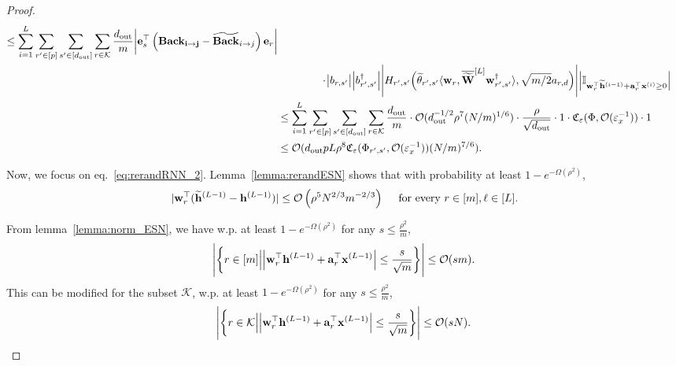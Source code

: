\begin{proof}
\begin{align}
				\le \sum_{i=1}^{L} \sum_{r' \in [p]} \sum_{s' \in [d_{\mathrm{out}} ]} \sum_{r \in \mathcal{K}} \frac{d_{\mathrm{out}} }{m} \abs{\mathbf{e}_s^{\top} \left(\mathbf{Back_{i \to j}} - \widetilde{\mathbf{Back}}_{i \to j} \right) \mathbf{e}_r}  \nonumber\\& \quad \quad \quad \quad \cdot \abs{b_{r, s'}} \abs{b_{r', s'}^{\dagger}} \abs{  H_{r', s'}\Big(\widetilde{\theta}_{r', s'} \langle \mathbf{w}_{r}, \overline{\widetilde{\mathbf{W}}}^{[L]} \mathbf{w}_{r', s'}^{\dagger}\rangle , \sqrt{m/2} a_{r, d}\Big)} \abs{\mathbb{I}_{\mathbf{w}_r^{\top} \widetilde{\mathbf{h}}^{(i-1)} + \mathbf{a}_r^{\top} \mathbf{x}^{(i)} \ge 0}} \nonumber\\&
				\le \sum_{i=1}^{L} \sum_{r' \in [p]} \sum_{s' \in [d_{\mathrm{out}} ]} \sum_{r \in \mathcal{K}} \frac{d_{\mathrm{out}} }{m} \cdot \mathcal{O}(d_{\mathrm{out}} ^{-1/2} \rho^7 (N/m)^{1/6}) \cdot \frac{\rho}{\sqrt{d_{\mathrm{out}} }} \cdot 1 \cdot \mathfrak{C}_{\varepsilon}(\Phi, \mathcal{O}(\varepsilon_x^{-1})) \cdot 1 \\&
				\le \mathcal{O}( d_{\mathrm{out}}  pL \rho^8 \mathfrak{C}_{\varepsilon}(\Phi_{r', s'}, \mathcal{O}(\varepsilon_x^{-1})) (N/m)^{7/6}) \label{eq:rerandRNN_1SOLVE}.
			\end{align}
			\endgroup
			
			
			Now, we focus on eq.~\ref{eq:rerandRNN_2}. Lemma~\ref{lemma:rerandESN} shows that with probability at least $1 - e^{-\Omega(\rho^2)}$,
			\begin{equation*}
				\abs[0]{\mathbf{w}_r^{\top} (\widetilde{\mathbf{h}}^{(L-1)} -  \mathbf{h}^{(L-1)})} \leq \mathcal{O}\left(\rho^{5} N^{2 / 3} m^{-2 / 3}\right) \quad \text { for every } r \in [m], \ell \in[L].
			\end{equation*}
			
			From lemma~\ref{lemma:norm_ESN}, we have w.p. at least $1 - e^{-\Omega(\rho^2)}$ for any $s \le \frac{\rho^2}{m}$,
			\begin{align*}
				\abs{\left\{r \in [m] \Big| \abs{\mathbf{w}_r^{\top} \mathbf{h}^{(L-1)} + \mathbf{a}_r^{\top} \mathbf{x}^{(L-1)}} \le \frac{s}{\sqrt{m}} \right\}} \le \mathcal{O}(sm).
			\end{align*}
			This can be modified for the subset $\mathcal{K}$,  w.p. at least $1 - e^{-\Omega(\rho^2)}$ for any $s \le \frac{\rho^2}{m}$,
			\begin{align*}
				\abs{\left\{r \in \mathcal{K} \Big| \abs{\mathbf{w}_r^{\top} \mathbf{h}^{(L-1)} + \mathbf{a}_r^{\top} \mathbf{x}^{(L-1)}} \le  \frac{s}{\sqrt{m}} \right\}} \le \mathcal{O}(sN).
			\end{align*}
			

\end{proof}
